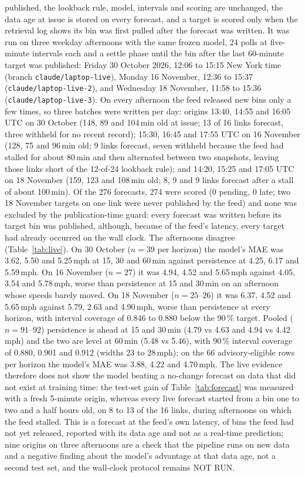 published, the lookback rule, model, intervals and scoring are unchanged, the data age at issue is stored on every
forecast, and a target is scored only when the retrieval log shows its bin was first pulled after the forecast was
written. It was run on three weekday afternoons with the same frozen model, 24 polls at five-minute intervals each and
a settle phase until the bin after the last 60-minute target was published: Friday 30 October 2026, 12:06 to 15:15
New York time (branch \texttt{claude/laptop-live}), Monday 16 November, 12:36 to 15:37 (\texttt{claude/laptop-live-2}),
and Wednesday 18 November, 11:58 to 15:36 (\texttt{claude/laptop-live-3}). On every afternoon the feed released new
bins only a few times, so three batches were written per day: origins 13:40, 14:55 and 16:05 UTC on 30 October (148,
89 and 104\,min old at issue; 13 of 16 links forecast, three withheld for no recent record); 15:30, 16:45 and 17:55 UTC
on 16 November (128, 75 and 96\,min old; 9 links forecast, seven withheld because the feed had stalled for about
80\,min and then alternated between two snapshots, leaving those links short of the 12-of-24 lookback rule); and
14:20, 15:25 and 17:05 UTC on 18 November (159, 123 and 108\,min old; 8, 9 and 9 links forecast after a stall of about
100\,min). Of the 276 forecasts, 274 were scored (0 pending, 0 late; two 18 November targets on one link were never
published by the feed) and none was excluded by the publication-time guard: every forecast was written before its
target bin was published, although, because of the feed's latency, every target had already occurred on the wall
clock. The afternoons disagree (Table~\ref{tab:live}). On 30 October ($n = 39$ per horizon) the model's MAE was 3.62,
5.50 and 5.25\,mph at 15, 30 and 60\,min against persistence at 4.25, 6.17 and 5.59\,mph. On 16 November ($n = 27$) it
was 4.94, 4.52 and 5.65\,mph against 4.05, 3.54 and 5.78\,mph, worse than persistence at 15 and 30\,min on an afternoon
whose speeds barely moved. On 18 November ($n = 25$--$26$) it was 6.37, 4.52 and 5.65\,mph against 5.79, 2.63 and
4.90\,mph, worse than persistence at every horizon, with interval coverage of 0.846 to 0.880 below the 90\,\% target.
Pooled ($n = 91$--$92$) persistence is ahead at 15 and 30\,min (4.79 vs 4.63 and 4.94 vs 4.42\,mph) and the two are
level at 60\,min (5.48 vs 5.46), with 90\,\% interval coverage of 0.880, 0.901 and 0.912 (widths 23 to 28\,mph); on the
66 advisory-eligible rows per horizon the model's MAE was 3.88, 4.22 and 4.70\,mph. The live evidence therefore does
not show the model beating a no-change forecast on data that did not exist at training time: the test-set gain of
Table~\ref{tab:forecast} was measured with a fresh 5-minute origin, whereas every live forecast started from a bin
one to two and a half hours old, on 8 to 13 of the 16 links, during afternoons on which the feed stalled. This is a
forecast at the feed's own latency, of bins the feed had not yet released, reported with its data age and not as a
real-time prediction; nine origins on three afternoons are a check that the pipeline runs on new data and a negative
finding about the model's advantage at that data age, not a second test set, and the wall-clock protocol remains
NOT RUN.

